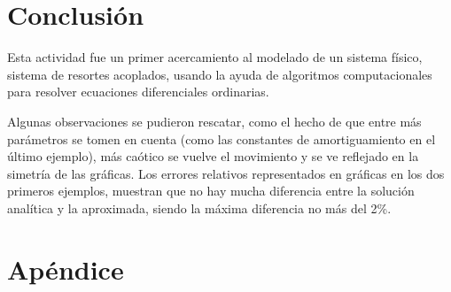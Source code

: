 \documentclass[a4paper]{article}
\begin{document}
\section{Conclusión}

Esta actividad fue un primer acercamiento al modelado de un sistema físico, sistema de resortes acoplados,  usando la ayuda de algoritmos computacionales para resolver ecuaciones diferenciales ordinarias. 

Algunas observaciones se pudieron rescatar, como el hecho de que entre más parámetros se tomen en cuenta (como las constantes de amortiguamiento en el último ejemplo), más caótico se vuelve el movimiento y se ve reflejado en la simetría de las gráficas. Los errores relativos representados en gráficas en los dos primeros ejemplos, muestran que no hay mucha diferencia entre la solución analítica y la aproximada, siendo la máxima diferencia no más del 2\%.

\section{Apéndice}
\end{document}
